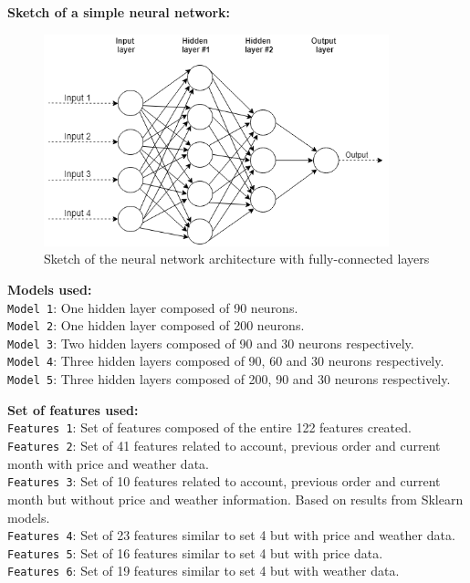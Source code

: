\textbf{Sketch of a simple neural network:}
\begin{figure}[h]
    \centering
    \includegraphics[width=10cm]{images/nn-sketch.png}
    \caption{Sketch of the neural network architecture with fully-connected layers}
    \label{fig-annex:nn-sketch}
\end{figure}

\noindent\textbf{Models used:}\\
\texttt{Model 1}: One hidden layer composed of 90 neurons. \\
\texttt{Model 2}: One hidden layer composed of 200 neurons. \\
\texttt{Model 3}: Two hidden layers composed of 90 and 30 neurons respectively. \\
\texttt{Model 4}: Three hidden layers composed of 90, 60 and 30 neurons respectively. \\
\texttt{Model 5}: Three hidden layers composed of 200, 90 and 30 neurons respectively. \\

\pagebreak

\noindent\textbf{Set of features used:}\\
\texttt{Features 1}: Set of features composed of the entire 122 features created. \\
\texttt{Features 2}: Set of 41 features related to account, previous order and current month with price and weather data. \\
\texttt{Features 3}: Set of 10 features related to account, previous order and current month but without price and weather information. Based on results from Sklearn models.\\
\texttt{Features 4}: Set of 23 features similar to set 4 but with price and weather data. \\
\texttt{Features 5}: Set of 16 features similar to set 4 but with price data. \\
\texttt{Features 6}: Set of 19 features similar to set 4 but with weather data. \\


